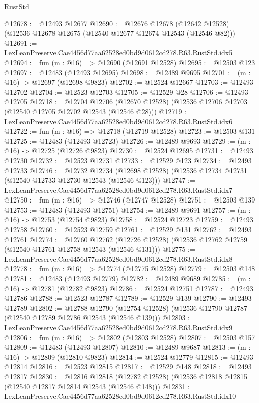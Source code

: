 \begin{lexlean}{RustStd}
\begin{coremodule}
@12678 := @12493 @12677
@12690 := @12676
    @12678
    (@12642 @12528)
    (@12536 @12678 @12675 (@12540 @12677 @12674 @12543 (@12546 @82)))
@12691 := LexLeanPreserve.Cae4456d77aa62528ed0bd9d0612cd278.R63.RustStd.idx5
@12694 := fun (m : @16) => @12690 (@12691 @12528)
@12695 := @12503 @123
@12697 := @12483 (@12493 @12695)
@12698 := @12489 @9695
@12701 := (m : @16) -> @12697 (@12698 @9823)
@12702 := @12524 @12667
@12703 := @12493 @12702
@12704 := @12523 @12703
@12705 := @12529 @28
@12706 := @12493 @12705
@12718 := @12704
    @12706
    (@12670 @12528)
    (@12536 @12706 @12703 (@12540 @12705 @12702 @12543 (@12546 @28)))
@12719 := LexLeanPreserve.Cae4456d77aa62528ed0bd9d0612cd278.R63.RustStd.idx6
@12722 := fun (m : @16) => @12718 (@12719 @12528)
@12723 := @12503 @131
@12725 := @12483 (@12493 @12723)
@12726 := @12489 @9693
@12729 := (m : @16) -> @12725 (@12726 @9823)
@12730 := @12524 @12695
@12731 := @12493 @12730
@12732 := @12523 @12731
@12733 := @12529 @123
@12734 := @12493 @12733
@12746 := @12732
    @12734
    (@12698 @12528)
    (@12536 @12734 @12731 (@12540 @12733 @12730 @12543 (@12546 @123)))
@12747 := LexLeanPreserve.Cae4456d77aa62528ed0bd9d0612cd278.R63.RustStd.idx7
@12750 := fun (m : @16) => @12746 (@12747 @12528)
@12751 := @12503 @139
@12753 := @12483 (@12493 @12751)
@12754 := @12489 @9691
@12757 := (m : @16) -> @12753 (@12754 @9823)
@12758 := @12524 @12723
@12759 := @12493 @12758
@12760 := @12523 @12759
@12761 := @12529 @131
@12762 := @12493 @12761
@12774 := @12760
    @12762
    (@12726 @12528)
    (@12536 @12762 @12759 (@12540 @12761 @12758 @12543 (@12546 @131)))
@12775 := LexLeanPreserve.Cae4456d77aa62528ed0bd9d0612cd278.R63.RustStd.idx8
@12778 := fun (m : @16) => @12774 (@12775 @12528)
@12779 := @12503 @148
@12781 := @12483 (@12493 @12779)
@12782 := @12489 @9689
@12785 := (m : @16) -> @12781 (@12782 @9823)
@12786 := @12524 @12751
@12787 := @12493 @12786
@12788 := @12523 @12787
@12789 := @12529 @139
@12790 := @12493 @12789
@12802 := @12788
    @12790
    (@12754 @12528)
    (@12536 @12790 @12787 (@12540 @12789 @12786 @12543 (@12546 @139)))
@12803 := LexLeanPreserve.Cae4456d77aa62528ed0bd9d0612cd278.R63.RustStd.idx9
@12806 := fun (m : @16) => @12802 (@12803 @12528)
@12807 := @12503 @157
@12809 := @12483 (@12493 @12807)
@12810 := @12489 @9687
@12813 := (m : @16) -> @12809 (@12810 @9823)
@12814 := @12524 @12779
@12815 := @12493 @12814
@12816 := @12523 @12815
@12817 := @12529 @148
@12818 := @12493 @12817
@12830 := @12816
    @12818
    (@12782 @12528)
    (@12536 @12818 @12815 (@12540 @12817 @12814 @12543 (@12546 @148)))
@12831 := LexLeanPreserve.Cae4456d77aa62528ed0bd9d0612cd278.R63.RustStd.idx10

\end{coremodule}
\end{lexlean}
